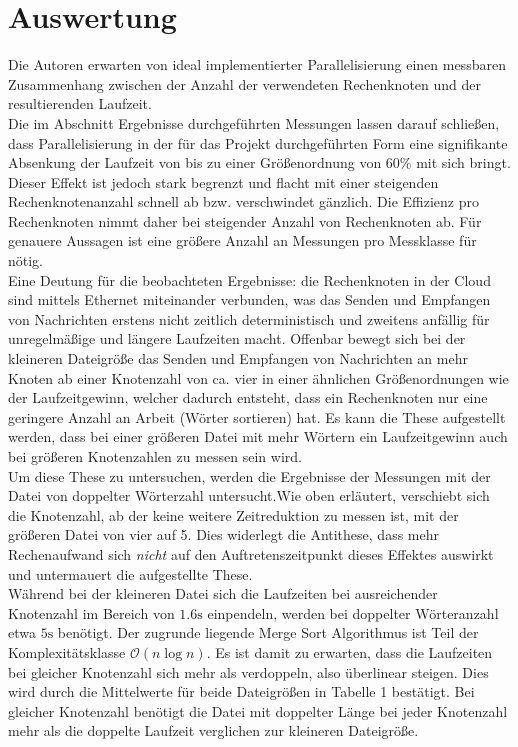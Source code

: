 \section{Auswertung}
Die Autoren erwarten von ideal implementierter Parallelisierung einen messbaren Zusammenhang zwischen der Anzahl der verwendeten Rechenknoten und der resultierenden Laufzeit.
\\
Die im Abschnitt Ergebnisse durchgeführten Messungen lassen darauf schließen, dass Parallelisierung in der für das Projekt durchgeführten Form eine signifikante Absenkung der Laufzeit von bis zu einer Größenordnung von 60\% mit sich bringt. Dieser Effekt ist jedoch stark begrenzt und flacht mit einer steigenden Rechenknotenanzahl schnell ab bzw. verschwindet gänzlich. Die Effizienz pro Rechenknoten nimmt daher bei steigender Anzahl von Rechenknoten ab. Für genauere Aussagen ist eine größere Anzahl an Messungen pro Messklasse für nötig.
\\
Eine Deutung für die beobachteten Ergebnisse: die Rechenknoten in der Cloud sind mittels Ethernet miteinander verbunden, was das Senden und Empfangen von Nachrichten erstens nicht zeitlich deterministisch und zweitens anfällig für unregelmäßige und längere Laufzeiten macht. Offenbar bewegt sich bei der kleineren Dateigröße das Senden und Empfangen von Nachrichten an mehr Knoten ab einer Knotenzahl von ca. vier in einer ähnlichen Größenordnungen wie der Laufzeitgewinn, welcher dadurch entsteht, dass ein Rechenknoten nur eine geringere Anzahl an Arbeit (Wörter sortieren) hat. Es kann die These aufgestellt werden, dass bei einer größeren Datei mit mehr Wörtern ein Laufzeitgewinn auch bei größeren Knotenzahlen zu messen sein wird.
\\
Um diese These zu untersuchen, werden die Ergebnisse der Messungen mit der Datei von doppelter Wörterzahl untersucht.Wie oben erläutert, verschiebt sich die Knotenzahl, ab der keine weitere Zeitreduktion zu messen ist, mit der größeren Datei von vier auf 5. Dies widerlegt die Antithese, dass mehr Rechenaufwand sich \textit{nicht} auf den Auftretenszeitpunkt dieses Effektes auswirkt und untermauert die aufgestellte These.
\\
Während bei der kleineren Datei sich die Laufzeiten bei ausreichender Knotenzahl im Bereich von $1.6\text{s}$ einpendeln, werden bei doppelter Wörteranzahl etwa $5\text{s}$ benötigt. Der zugrunde liegende Merge Sort Algorithmus ist Teil der Komplexitätsklasse ${\mathcal{O}(n\log{n})}$. Es ist damit zu erwarten, dass die Laufzeiten bei gleicher Knotenzahl sich mehr als verdoppeln, also überlinear steigen. Dies wird durch die Mittelwerte für beide Dateigrößen in Tabelle 1 bestätigt. Bei gleicher Knotenzahl benötigt die Datei mit doppelter Länge bei jeder Knotenzahl mehr als die doppelte Laufzeit verglichen zur kleineren Dateigröße.
